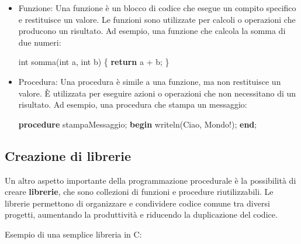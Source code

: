\documentclass[
  letterpaper,
  DIV=11,
  numbers=noendperiod]{scrreprt}
\newenvironment{Shaded}{\begin{snugshade}}{\end{snugshade}}
\newcommand{\ControlFlowTok}[1]{\textcolor[rgb]{0.00,0.23,0.31}{\textbf{#1}}}
\newcommand{\DataTypeTok}[1]{\textcolor[rgb]{0.68,0.00,0.00}{#1}}
\newcommand{\KeywordTok}[1]{\textcolor[rgb]{0.00,0.23,0.31}{\textbf{#1}}}
\newcommand{\NormalTok}[1]{\textcolor[rgb]{0.00,0.23,0.31}{#1}}
\newcommand{\OperatorTok}[1]{\textcolor[rgb]{0.37,0.37,0.37}{#1}}
\newcommand{\StringTok}[1]{\textcolor[rgb]{0.13,0.47,0.30}{#1}}
\begin{document}
\begin{itemize}
\item
  Funzione: Una funzione è un blocco di codice che esegue un compito
  specifico e restituisce un valore. Le funzioni sono utilizzate per
  calcoli o operazioni che producono un risultato. Ad esempio, una
  funzione che calcola la somma di due numeri:

\begin{Shaded}
\begin{Highlighting}[]
\DataTypeTok{int}\NormalTok{ somma}\OperatorTok{(}\DataTypeTok{int}\NormalTok{ a}\OperatorTok{,} \DataTypeTok{int}\NormalTok{ b}\OperatorTok{)} \OperatorTok{\{}
    \ControlFlowTok{return}\NormalTok{ a }\OperatorTok{+}\NormalTok{ b}\OperatorTok{;}
\OperatorTok{\}}
\end{Highlighting}
\end{Shaded}
\item
  Procedura: Una procedura è simile a una funzione, ma non restituisce
  un valore. È utilizzata per eseguire azioni o operazioni che non
  necessitano di un risultato. Ad esempio, una procedura che stampa un
  messaggio:

\begin{Shaded}
\begin{Highlighting}[]
\KeywordTok{procedure}\NormalTok{ stampaMessaggio;}
\KeywordTok{begin}
\NormalTok{    writeln(}\StringTok{\textquotesingle{}Ciao, Mondo!\textquotesingle{}}\NormalTok{);}
\KeywordTok{end}\NormalTok{;}
\end{Highlighting}
\end{Shaded}
\end{itemize}

\subsection{Creazione di librerie}\label{creazione-di-librerie}

Un altro aspetto importante della programmazione procedurale è la
possibilità di creare \textbf{librerie}, che sono collezioni di funzioni
e procedure riutilizzabili. Le librerie permettono di organizzare e
condividere codice comune tra diversi progetti, aumentando la
produttività e riducendo la duplicazione del codice.

Esempio di una semplice libreria in C:
\end{document}
